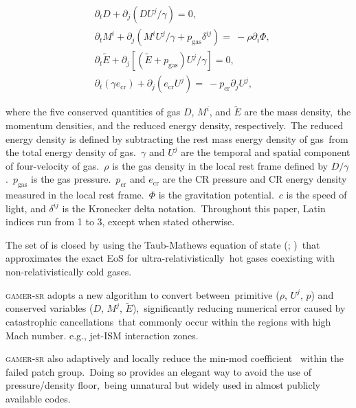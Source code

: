 \documentclass[twocolumn]{aastex631}
\begin{document}
  \begin{subequations}
    \label{governing-eq}
    \begin{align}
     &\partial_{t} D+\partial_{j} \left(DU^{j}/\gamma\right)=0,\label{D evolution}\\
     &\partial_{t} M^{i}+\partial_{j} \left(M^{i}U^{j}/\gamma+p_{\text{gas}}\delta^{ij}\right)=\
     -\rho\partial_{i}\Phi,\label{M evolution}\\
     &\partial_{t} \tilde{E}+\partial_j \left[\left(\tilde{E}+p_{\text{gas}}\right)U^{j}/\gamma\right]=0, \label{E evoltion}\\
     &\partial_{t} \left(\gamma e_{\text{cr}}\right) + \partial_{j} \left(e_{\text{cr}}U^{j}\right)=\
     -p_{\text{cr}} \partial_{j} U^{j},\label{D evolution}
    \end{align}
  \end{subequations}


  where the five conserved quantities of gas $D$, $M^{i}$, and $\tilde{E}$ are the mass density,\
  the momentum densities, and the reduced energy density, respectively.\
  The reduced energy density is defined by subtracting the rest mass energy density of gas\
  from the total energy density of gas.\
  $\gamma$ and $U^{j}$ are the temporal and spatial component of four-velocity of gas.\
  $\rho$ is the gas density in the local rest frame defined by $D/\gamma$.\
  $p_{\text{gas}}$ is the gas pressure.\
  $p_{\text{cr}}$ and $e_{\text{cr}}$ are the CR pressure and CR energy density measured in the local rest frame.\
  $\Phi$ is the gravitation potential.\
  $c$ is the speed of light, and $\delta^{ij}$ is the Kronecker delta notation.\
  Throughout this paper, Latin indices run from 1 to 3, except when stated otherwise.\

  The set of \Cref{governing-eq} is closed by using the Taub-Mathews equation of state (\citealt{Taub}; \citealt{TM_EOS})\
  that approximates the exact EoS \citep{Synge} for ultra-relativistically\
  hot gases coexisting with non-relativistically cold gases.

  \textsc{gamer-sr} adopts a new algorithm \citep{tseng2021} to convert between\
  primitive ($\rho$, $U^{j}$, $p$) and conserved variables ($D$, $M^{j}$, $\tilde{E}$),\
  significantly reducing numerical error caused by catastrophic cancellations\
  that commonly occur within the regions with high Mach number. e.g., jet-ISM interaction zones.

  \textsc{gamer-sr} also adaptively and locally reduce the min-mod coefficient\
  \citep{tseng2021} within the failed patch group.\
  Doing so provides an elegant way to avoid the use of pressure/density floor,\
  being unnatural but widely used in almost publicly available codes.\
\end{document}
